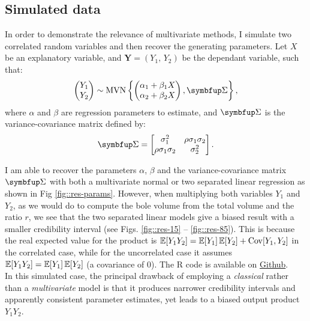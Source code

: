 \subsection{Simulated data}
In order to demonstrate the relevance of multivariate methods, I simulate two correlated random variables and then recover the generating parameters. Let \( X \) be an explanatory variable, and \( \mathbf{Y} = (Y_1, \, Y_2) \) be the dependant variable, such that:
\[
	\begin{pmatrix}
		Y_1 \\
		Y_2
	\end{pmatrix} \sim
	\MVN\left\{ \begin{pmatrix}
		\alpha_1 + \beta_1 X \\
		\alpha_2 + \beta_2 X \\
	\end{pmatrix}, \Sigmabf \right\},
\]
where \( \alpha \) and \( \beta \) are regression parameters to estimate, and \( \Sigmabf \) is the variance-covariance matrix defined by:
\[
	\Sigmabf = \begin{bmatrix}
		\sigma_1^2 & \rho \sigma_1 \sigma_2 \\
		\rho \sigma_1 \sigma_2 & \sigma_2^2
	\end{bmatrix}. \\
\]

I am able to recover the parameters \( \alpha \), \( \beta \) and the variance-covariance matrix \( \Sigmabf \) with both a multivariate normal or two separated linear regression as shown in Fig \ref{fig::res-params}. However, when multiplying both variables \( Y_1 \) and \( Y_2 \), as we would do to compute the bole volume from the total volume and the ratio \( r \), we see that the two separated linear models give a biased result with a smaller credibility interval (see Figs. \ref{fig::res-15} -- \ref{fig::res-85}). This is because the real expected value for the product is \( \operatorname{\mathbb{E}}[Y_1 Y_2] = \operatorname{\mathbb{E}}[Y_1] \operatorname{\mathbb{E}}[Y_2] + \operatorname{Cov}[Y_1, Y_2] \) in the correlated case, while for the uncorrelated case it assumes \( \operatorname{\mathbb{E}}[Y_1 Y_2] = \operatorname{\mathbb{E}}[Y_1] \operatorname{\mathbb{E}}[Y_2] \) (\ie a covariance of \num{0}). The R code is available on \href{https://github.com/amael-ls/emerge/tree/main/communications/cst/2025-10-30/code}{ Github}. \\

In this simulated case, the principal drawback of employing a \textit{classical} rather than a \textit{multivariate} model is that it produces narrower credibility intervals and apparently consistent parameter estimates, yet leads to a biased output product \( Y_1 Y_2\).

